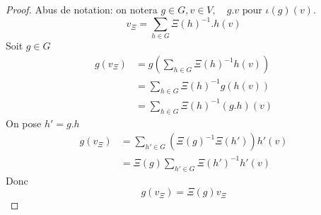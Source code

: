 \documentclass[../main.tex]{subfiles}
\begin{document}
\begin{proof}
	Abus de notation: on notera $g \in G, v \in V, \quad g.v \text{ pour } \iota( g) ( v) $.\\
	\[ 
		v_{\Xi} = \sum_{h \in G} \Xi( h) ^{-1}. h( v) 
	\]
	Soit $g \in G$ 
	\begin{align*}
		g( v_{\Xi} ) &= g\left( \sum_{h\in G} \Xi( h) ^{-1}h( v)   \right) \\
			     &= \sum_{h\in G} \Xi( h) ^{-1}g( h( v) ) \\
			     &= \sum_{h \in G} \Xi( h) ^{-1}( g.h) ( v) 
	\end{align*}
	On pose $h'= g.h$ 
	\begin{align*}
		g( v_{\Xi} ) &= \sum_{h'\in G} ( \Xi( g)^{-1}\Xi( h') ) h'( v) \\
			     &= \Xi( g) \sum_{h'\in G} \Xi( h') ^{-1}h'( v) 
	\end{align*}
	Donc
	\[ 
		g( v_{\Xi} )= \Xi( g) v_{\Xi} 
	\]
	
	
\end{proof}


	
\end{document}
